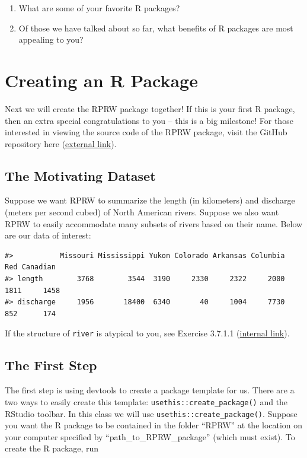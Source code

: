 \documentclass[
]{book}
\begin{document}
\begin{enumerate}
\def\labelenumi{\arabic{enumi}.}
\item
  What are some of your favorite R packages?
\item
  Of those we have talked about so far, what benefits of R packages are most appealing to you?
\end{enumerate}

\hypertarget{creating-an-r-package}{%
\section{Creating an R Package}\label{creating-an-r-package}}

Next we will create the RPRW package together! If this is your first R package, then an extra special congratulations to you -- this is a big milestone! For those interested in viewing the source code of the RPRW package, visit the GitHub repository here (\href{https://github.com/michaeldumelle/RPRW}{external link}).

\hypertarget{the-motivating-dataset}{%
\subsection{The Motivating Dataset}\label{the-motivating-dataset}}

Suppose we want RPRW to summarize the length (in kilometers) and discharge (meters per second cubed) of North American rivers. Suppose we also want RPRW to easily accommodate many subsets of rivers based on their name. Below are our data of interest:

\begin{verbatim}
#>           Missouri Mississippi Yukon Colorado Arkansas Columbia  Red Canadian
#> length        3768        3544  3190     2330     2322     2000 1811     1458
#> discharge     1956       18400  6340       40     1004     7730  852      174
\end{verbatim}

If the structure of \texttt{river} is atypical to you, see Exercise 3.7.1.1 (\protect\hyperlink{ex-set14}{internal link}).

\hypertarget{first-step}{%
\subsection{The First Step}\label{first-step}}

The first step is using devtools to create a package template for us. There are a two ways to easily create this template: \texttt{usethis::create\_package()} and the RStudio toolbar. In this class we will use \texttt{usethis::create\_package()}. Suppose you want the R package to be contained in the folder ``RPRW'' at the location on your computer specified by ``path\_to\_RPRW\_package'' (which must exist). To create the R package, run
\end{document}
